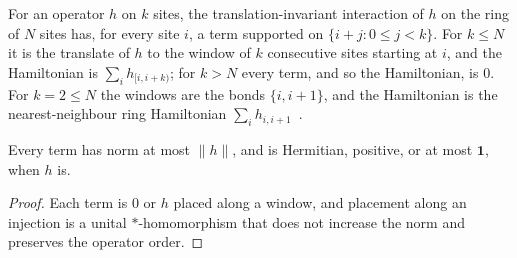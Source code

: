 \begin{definition}
    \label{def:hamiltonians_translation_invariant}
    \leanok
    For an operator $h$ on $k$ sites, the translation-invariant interaction of $h$ on the
    ring of $N$ sites has, for every site $i$, a term supported on $\{i+j: 0\le j<k\}$.
    For $k\le N$ it is the translate of $h$ to the window of $k$ consecutive sites starting
    at $i$, and the Hamiltonian is $\sum_i h_{[i,i+k)}$; for $k>N$ every term, and so the
    Hamiltonian, is $0$. For $k=2\le N$ the windows are the bonds $\{i,i+1\}$, and the
    Hamiltonian is the nearest-neighbour ring Hamiltonian
    $\sum_i h_{i,i+1}$~\cite{Schuch2011Phases}.
\end{definition}

\begin{lemma}
    \label{lem:hamiltonians_translation_invariant_terms}
    \leanok
    Every term has norm at most $\|h\|$, and is Hermitian, positive, or at most
    $\mathbf 1$, when $h$ is.
\end{lemma}
\begin{proof}\leanok
    Each term is $0$ or $h$ placed along a window, and placement along an injection is a
    unital $*$-homomorphism that does not increase the norm and preserves the operator
    order.
\end{proof}

